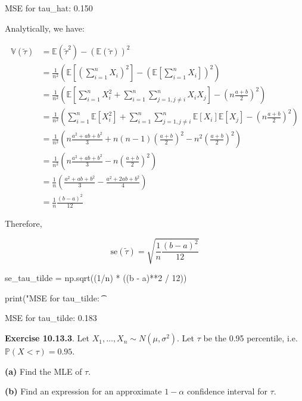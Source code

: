 \begin{console}
MSE for tau\_hat:         0.150
\end{console}

Analytically, we have:

\begin{align*}
\mathbb{V}(\tilde{\tau}) 
&= \mathbb{E}(\tilde{\tau}^{2}) - (\mathbb{E}(\tilde{\tau}))^{2} \\
&= \frac{1}{n^{2}}\left(\mathbb{E}\left[ \left(\sum_{i=1}^{n} X_{i}\right)^{2}\right] - \left(\mathbb{E}\left[\sum_{i=1}^{n} X_{i} \right]\right)^{2}\right) \\
&= \frac{1}{n^{2}}\left( \mathbb{E}\left[ \sum_{i=1}^{n} X_{i}^{2} + \sum_{i=1}^{n} \sum_{j=1, j \neq i}^{n} X_{i} X_{j} \right] - \left(n \frac{a + b}{2}\right)^{2}\right) \\
&= \frac{1}{n^{2}}\left( \sum_{i=1}^{n} \mathbb{E}[X_{i}^{2}] + \sum_{i=1}^{n} \sum_{j=1, j \neq i}^{n} \mathbb{E}[X_{i}]\mathbb{E}[X_{j}]  - \left(n \frac{a + b}{2}\right)^{2}\right) \\
&= \frac{1}{n^{2}}\left( n \frac{a^{2} + ab + b^{2}}{3} + n(n-1) \left(\frac{a+b}{2}\right)^{2}  - n^{2}\left(\frac{a + b}{2}\right)^{2}\right) \\
&= \frac{1}{n^{2}}\left( n \frac{a^{2} + ab + b^{2}}{3} - n \left(\frac{a+b}{2}\right)^{2} \right) \\
&= \frac{1}{n} \left( \frac{a^{2} + ab + b^{2}}{3} - \frac{a^{2} + 2ab + b^{2}}{4}\right) \\
&= \frac{1}{n} \frac{(b - a)^{2}}{12}
\end{align*}

Therefore,

\[\text{se}(\tilde{\tau}) = \sqrt{\frac{1}{n} \frac{(b - a)^{2}}{12}}\]

\begin{python}
se_tau_tilde = np.sqrt((1/n) * ((b - a)**2 / 12))

print("MSE for tau_tilde: \t %
\end{python}

\begin{console}
MSE for tau\_tilde:       0.183
\end{console}

\textbf{Exercise 10.13.3}. Let
\(X_{1}, \dots, X_{n} \sim N(\mu, \sigma^{2})\). Let \(\tau\) be the 0.95
percentile, i.e.~\(\mathbb{P}(X < \tau) = 0.95\).

\textbf{(a)} Find the MLE of \(\tau\).

\textbf{(b)} Find an expression for an approximate \(1 - \alpha\)
confidence interval for \(\tau\).

